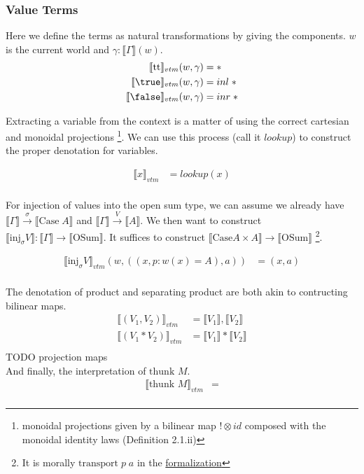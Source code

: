 \documentclass{article}
\newcommand{\den}[1]{\llbracket #1 \rrbracket}
\newcommand{\thunk}[1]{\textrm{thunk }#1}
\newcommand{\injj}[2]{\textrm{inj}_{#1}#2}
\newcommand{\ttt}{\textrm{tt}}
\begin{document}
\subsubsection{Value Terms}
Here we define the terms as natural transformations by giving the components. $w$ is the current world and 
$\gamma : \llbracket \Gamma \rrbracket(w)$. 
\begin{align*}
    \llbracket  \ttt \rrbracket_{vtm}(w, \gamma) &= *\\
    \llbracket  \true \rrbracket_{vtm}(w,\gamma) &= inl \;*\\
    \llbracket  \false \rrbracket_{vtm}(w,\gamma) &= inr \;*\\
\end{align*}

Extracting a variable from the context is a matter of using the correct cartesian and monoidal projections
\footnote{monoidal projections given by a bilinear map $! \otimes id$ composed with the monoidal identity laws 
\cite{JACOBS199473}(Definition 2.1.ii)}. We can use this process (call it $lookup$) to construct the proper 
denotation for variables.

\begin{align*}
    \llbracket  x \rrbracket_{vtm} &= lookup(x) \\
\end{align*}

For injection of values into the open sum type, we can assume we already have 
$\den{\Gamma} \xrightarrow{\sigma} \den{\textrm{Case} \; A}$ and $\den{\Gamma} \xrightarrow{V} \den{A}$.
 We then want to construct $\den{\injj{\sigma}{V}} : \den{\Gamma} \rightarrow \den{\textrm{OSum}}$. 
It suffices to construct $\den{\textrm{Case} A \times A} \rightarrow \den{\textrm{OSum}}$
\footnote{It is morally $\textrm{transport} \; p \; a$ in the 
\href{https://github.com/bond15/Bunched-CBPV/blob/a2da10ec10f7bedcce8ded4aea6646b3a184d0b4/src/Models/FuturePast.agda#L264}
{formalization} }.

\begin{align*}
    \llbracket  \injj{\sigma}{V}\rrbracket_{vtm}(w, ((x , p : w(x)=A), a)) &= (x , a )\\
\end{align*}

The denotation of product and separating product are both akin to contructing bilinear maps.
\begin{align*}
    \llbracket  (V_1, V_2)\rrbracket_{vtm} &= \den{V_1} , \den{V_2}\\
    \llbracket  (V_1 * V_2)\rrbracket_{vtm} &= \den{V_1} * \den{V_2}\\
\end{align*}
TODO projection maps\\
And finally, the interpretation of $\thunk{M}$.
\begin{align*}
    \llbracket  \thunk{M}\rrbracket_{vtm} &= \\
\end{align*}
\end{document}
